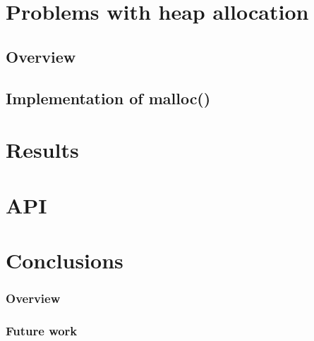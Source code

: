 \documentclass[bsc,frontabs,twoside,singlespacing,parskip,deptreport]{infthesis}     %
\begin{document}
\chapter{Problems with heap allocation}

\section{Overview}

\section{Implementation of malloc()}


\chapter{Results}

\chapter{API}

\chapter{Conclusions}

\subsection{Overview}

\subsection{Future work}




\end{document}
